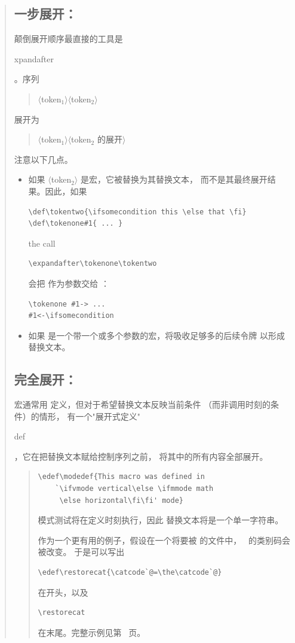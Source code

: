 \documentclass[a4paper]{rapport3}
\makeatletter
\def\gr#1{$\langle$#1$\rangle$}\def\key#1{{\tt#1}}
\newenvironment{disp}{\begin{quotation}}{\end{quotation}}
\newenvironment{example}{\begin{quotation}}{\end{quotation}}
\def\cstoidx#1\par{\index{#1@\cs{#1}}}
\def\csidx#1{\cstoidx #1\par\cs{#1}}
\makeatother
\begin{document}
\begin{disp}
\subsection{一步展开：\protect{}}

颠倒展开顺序最直接的工具是 \csidx{expandafter}。序列
\begin{disp}\gr{token$_1$}\gr{token$_2$}\end{disp}
展开为 \begin{disp}\gr{token$_1$}\gr{\italic token$_2$ 的展开}
\end{disp}
注意以下几点。
\begin{itemize} \item 如果 \gr{token$_2$} 是宏，它被替换为其替换文本，
而不是其最终展开结果。因此，如果 
\begin{verbatim}
\def\tokentwo{\ifsomecondition this \else that \fi}
\def\tokenone#1{ ... }
\end{verbatim}
the call \begin{verbatim}
\expandafter\tokenone\tokentwo
\end{verbatim}
会把  作为参数交给 ：
\begin{verbatim}
\tokenone #1-> ...
#1<-\ifsomecondition
\end{verbatim}
\item 如果  是一个带一个或多个参数的宏，将吸收足够多的后续令牌
以形成替换文本。\end{itemize}

\subsection{完全展开：\protect{}}
\label{expand:edef}

宏通常用  定义，但对于希望替换文本反映当前条件
（而非调用时刻的条件）的情形，
有一个"展开式定义"\csidx{edef}，它在把替换文本赋给控制序列之前，
将其中的所有内容全部展开。

\begin{example}\begin{verbatim}
\edef\modedef{This macro was defined in
    `\ifvmode vertical\else \ifmmode math
     \else horizontal\fi\fi' mode}
\end{verbatim}
模式测试将在定义时刻执行，因此
替换文本将是一个单一字符串。

作为一个更有用的例子，假设在一个将要被  的文件中，
~\n@ 的类别码会被改变。
于是可以写出
\begin{verbatim}
\edef\restorecat{\catcode`@=\the\catcode`@}
\end{verbatim}
在开头，以及
\begin{verbatim}
\restorecat
\end{verbatim}
在末尾。完整示例见第~\pageref{store:cat} 页。
\end{example}


\end{disp}
\end{document}
